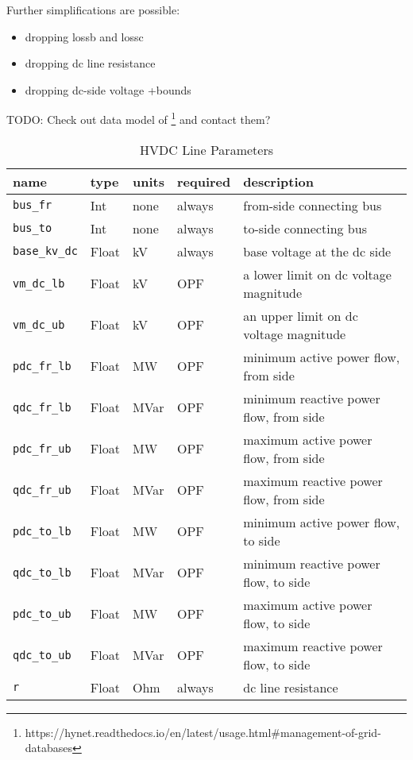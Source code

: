 \documentclass{article}
\begin{document}
Further simplifications are possible:
\begin{itemize}
    \item dropping lossb and lossc
    \item dropping dc line resistance
    \item dropping dc-side voltage +bounds
\end{itemize}

{\color{red}TODO: Check out data model of \cite{Hotz2018}\footnote{https://hynet.readthedocs.io/en/latest/usage.html\#management-of-grid-databases} and contact them?} 

\begin{table}[h]
\centering
\caption{HVDC Line Parameters}
\begin{tabular}{|l|l|l|l|p{7cm}|}
\hline
name & type & units & required & description \\ 
\hline
\hline
\texttt{bus\_fr} & Int & none & always & from-side connecting bus \\ 
\hline
\texttt{bus\_to} & Int & none & always & to-side connecting bus \\ 
\hline
\texttt{base\_kv\_dc} & Float & kV & always & base voltage at the dc side\\ 
\hline
\texttt{vm\_dc\_lb} & Float & kV & OPF & a lower limit on dc voltage magnitude \\ 
\hline
\texttt{vm\_dc\_ub} & Float & kV & OPF & an upper limit on dc voltage magnitude \\ 
\hline
\texttt{pdc\_fr\_lb} & Float & MW & OPF & minimum active power flow, from side \\ 
\hline
\texttt{qdc\_fr\_lb} & Float & MVar & OPF & minimum reactive power flow, from side \\ 
\hline
\texttt{pdc\_fr\_ub} & Float & MW & OPF & maximum active power flow, from side \\ 
\hline
\texttt{qdc\_fr\_ub} & Float & MVar & OPF & maximum reactive power flow, from side \\ 
\hline
\texttt{pdc\_to\_lb} & Float & MW & OPF & minimum active power flow, to side \\ 
\hline
\texttt{qdc\_to\_lb} & Float & MVar & OPF & minimum reactive power flow, to side \\
\hline
\texttt{pdc\_to\_ub} & Float & MW & OPF & maximum active power flow, to side \\ 
\hline
\texttt{qdc\_to\_ub} & Float & MVar & OPF & maximum reactive power flow, to side \\
\hline
\texttt{r} & Float & Ohm & always & dc line resistance \\

\end{tabular}
\end{table}
\end{document}
